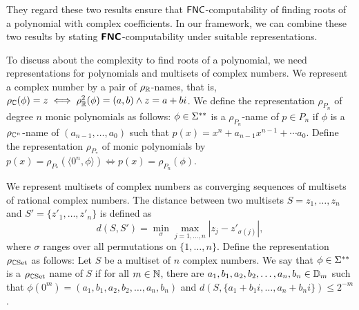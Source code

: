 \documentclass[envcountsame,orivec,oribibl]{llncs}
\begin{document}
They regard these two results ensure that $\mathsf{FNC}$-computability
of finding roots of a polynomial with complex coefficients.
In our framework, we can combine these two results by stating 
$\text{\bfseries \sffamily \upshape FNC}$-computability under suitable representations.

To discuss about the complexity to find roots of a polynomial,
we need representations for polynomials and multisets of complex numbers.
We represent a complex number by a pair of $\rho _\mathbb R$-names,
that is, $\rho_\mathbb C(\phi) = z \iff \rho_\mathbb R^2(\phi) = (a, b) \wedge z = a+bi$.
We define the representation $\rho_{P_n}$ of degree $n$ monic polynomials as follows: 
$\phi \in \Sigma ^{**}$ is a $\rho_{P_n}$-name of $p \in P_n$ 
if $\phi$ is a $\rho_{\mathbb C^n}$-name of $(a_{n-1}, \dots, a_0)$ 
such that $p(x) = x^n + a_{n-1}x^{n-1} + \cdots a_0$.
Define the representation $\rho_{P_*}$ of monic polynomials by
$p(x) = \rho_{P_*}(\langle 0^n, \phi \rangle) \iff p(x) = \rho_{P_n}(\phi)$.

We represent multisets of complex numbers as converging sequences of 
multisets of rational complex numbers.
The distance between two multisets $S = {z_1, \dots, z_n}$
and $S' = \{z'_1, \dots, z'_n\}$ is defined as
\begin{equation}
d(S, S') = \min_{\sigma} \max_{j = 1, \ldots, n}|z_j - z'_{\sigma(j)}|,
\end{equation}
where $\sigma$ ranges over all permutations on $\{1, \ldots, n\}$. 
Define the representation $\rho_{\mathbb C\mathrm{Set}}$ as follows:
Let $S$ be a multiset of $n$ complex numbers. 
We say that $\phi \in \Sigma ^{**}$ is a $\rho_{\mathbb C\mathrm{Set}}$ name of $S$ if
for all $m \in \mathbb N$, there are $a_1, b_1, a_2, b_2, \dots, a_n, b_n \in \mathbb D_m$
such that $\phi(0^m) = ( a_1, b_1, a_2, b_2, \dots, a_n, b_n )$
and $d(S, \{a_1 + b_1 i, \dots, a_n + b_n i\}) \le 2^{-m}$.

\end{document}
